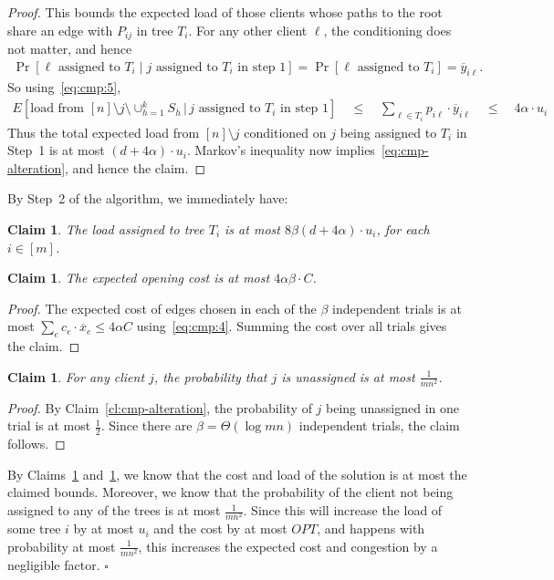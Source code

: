 \documentclass[letterpaper,11pt]{article}
\newtheorem{claim}[thm]{Claim}
\newcommand{\ox}{\ensuremath{\overline{x}}\xspace}
\newcommand{\oy}{\ensuremath{\overline{y}}\xspace}
\newenvironment{proofof}[1]{

\noindent{\bf Proof of {#1}:}}
{\hfill$\square$


}
\def\oy{\overline{y}}
\def\ox{\overline{x}}
\begin{document}
\begin{proof}
  This bounds the expected load of those clients whose paths to the root
  share an edge with $P_{ij}$ in tree $T_i$. For any other client
  $\ell$, the conditioning does not matter, and hence
  \begin{gather*}
    \Pr[\ell\mbox{ assigned to }T_i\mid j\mbox{ assigned to
    $T_i$ in step~1} ]=\Pr[\ell\mbox{ assigned to }T_i] = \oy_{i\ell}.
  \end{gather*}
  So using~\eqref{eq:cmp:5},
  \begin{gather*}
    E[\mbox{load from }[n]\setminus j\setminus \cup_{h=1}^k S_h \, | \,
    j\mbox{ assigned to $T_i$ in step~1}] \quad \le \quad \sum_{\ell\in T_i}
    p_{i\ell}\cdot \oy_{i\ell} \quad \le \quad 4\alpha\cdot u_i
  \end{gather*}
  Thus the total expected load from $[n]\setminus j$ conditioned on $j$
  being assigned to $T_i$ in Step~1 is at most $(d+4\alpha)\cdot
  u_i$. Markov's inequality now implies~\eqref{eq:cmp-alteration}, and
  hence the claim.
\end{proof}

By Step~2 of the algorithm, we immediately have:
\begin{claim}
  \label{cl:cmp-load}
  The load assigned to tree $T_i$ is at most $8\beta(d+4\alpha)\cdot
  u_i$, for each $i\in[m]$.
\end{claim}

\begin{claim}
  \label{cl:cmp-open}
  The expected opening cost is at most $4\alpha\beta \cdot C$.
\end{claim}
\begin{proof}
  The expected cost of edges chosen in each of the $\beta$ independent
  trials is at most $\sum_e c_e\cdot \ox_e \le 4\alpha C$
  using~\eqref{eq:cmp:4}. Summing the cost over all trials gives the
  claim.
\end{proof}

\begin{claim}
  For any client $j$, the probability that $j$ is unassigned is at most
  $\frac{1}{mn^2}$.
\end{claim}
\begin{proof}
  By Claim~\ref{cl:cmp-alteration}, the probability of $j$ being
  unassigned in one trial is at most $\frac12$. Since there are
  $\beta=\Theta(\log mn)$ independent trials, the claim follows.
\end{proof}

\begin{proofof}{Theorem~\ref{thm:cmp}}
  By Claims~\ref{cl:cmp-load} and~\ref{cl:cmp-open}, we know that the
  cost and load of the solution is at most the claimed bounds. Moreover,
  we know that the probability of the client not being assigned to any
  of the trees is at most $\frac{1}{mn^2}$. Since this will increase the
 load of some tree $i$ by at most $u_i$ and the cost by at most $OPT$,
  and happens with probability at most $\frac{1}{mn^2}$, this increases
  the expected cost and congestion by a negligible factor.
\end{proofof}
\end{document}
